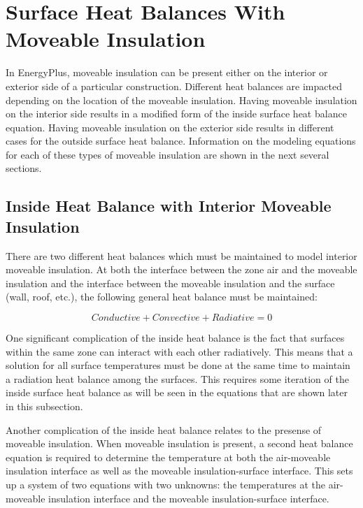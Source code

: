 \section{Surface Heat Balances With Moveable Insulation}\label{surface-heat-balances-with-moveable-insulation}

In EnergyPlus, moveable insulation can be present either on the interior or exterior side of a particular construction. Different heat balances are impacted depending on the location of the moveable insulation.  Having moveable insulation on the interior side results in a modified form of the inside surface heat balance equation.  Having moveable insulation on the exterior side results in different cases for the outside surface heat balance.  Information on the modeling equations for each of these types of moveable insulation are shown in the next several sections.

\subsection{Inside Heat Balance with Interior Moveable Insulation}\label{inside-heat-balance-with-interior-moveable-insulation}

There are two different heat balances which must be maintained to model interior moveable insulation.  At both the interface between the zone air and the moveable insulation and the interface between the moveable insulation and the surface (wall, roof, etc.), the following general heat balance must be maintained:

\begin{equation}
Conductive + Convective + Radiative = 0
\label{eq:BasicSteadyStateHeatBalanceEquation}
\end{equation}

One significant complication of the inside heat balance is the fact that surfaces within the same zone can interact with each other radiatively.  This means that a solution for all surface temperatures must be done at the same time to maintain a radiation heat balance among the surfaces.  This requires some iteration of the inside surface heat balance as will be seen in the equations that are shown later in this subsection.

Another complication of the inside heat balance relates to the presense of moveable insulation.  When moveable insulation is present, a second heat balance equation is required to determine the temperature at both the air-moveable insulation interface as well as the moveable insulation-surface interface.  This sets up a system of two equations with two unknowns: the temperatures at the air-moveable insulation interface and the moveable insulation-surface interface.

